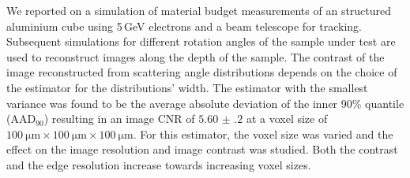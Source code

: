 \documentclass{PoS}
\newcommand{\aadninety}{\ensuremath{\textrm{AAD}_\textrm{90}}}
\begin{document}
We reported on a simulation of material budget measurements of an structured aluminium cube using 5\,GeV electrons and a beam telescope for tracking. 
Subsequent simulations for different rotation angles of the sample under test are used to reconstruct images along the depth of the sample. 
The contrast of the image reconstructed from scattering angle distributions depends on the choice of the estimator for the distributions' width. 
The estimator with the smallest variance was found to be the average absolute deviation of the inner 90\% quantile ($\aadninety$) resulting in an image CNR of $\num{5.60(20)}$ at a voxel size of $\SI{100}{\um} \times \SI{100}{\um} \times \SI{100}{\um}$.
For this estimator, the voxel size was varied and the effect on the image resolution and image contrast was studied.
Both the contrast and the edge resolution increase towards increasing voxel sizes. 






\end{document}
